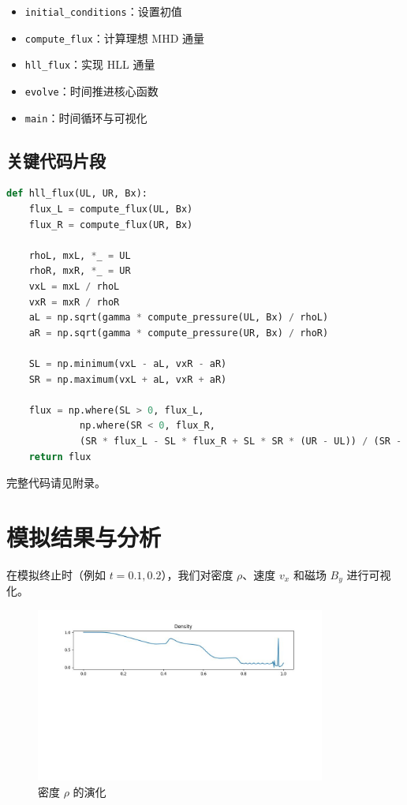 \documentclass[12pt]{article}
\begin{document}
\begin{itemize}
    \item \texttt{initial\_conditions}：设置初值
    \item \texttt{compute\_flux}：计算理想 MHD 通量
    \item \texttt{hll\_flux}：实现 HLL 通量
    \item \texttt{evolve}：时间推进核心函数
    \item \texttt{main}：时间循环与可视化
\end{itemize}

\subsection*{关键代码片段}

\begin{lstlisting}[language=Python, caption=HLL 数值通量计算]
def hll_flux(UL, UR, Bx):
    flux_L = compute_flux(UL, Bx)
    flux_R = compute_flux(UR, Bx)

    rhoL, mxL, *_ = UL
    rhoR, mxR, *_ = UR
    vxL = mxL / rhoL
    vxR = mxR / rhoR
    aL = np.sqrt(gamma * compute_pressure(UL, Bx) / rhoL)
    aR = np.sqrt(gamma * compute_pressure(UR, Bx) / rhoR)

    SL = np.minimum(vxL - aL, vxR - aR)
    SR = np.maximum(vxL + aL, vxR + aR)

    flux = np.where(SL > 0, flux_L,
             np.where(SR < 0, flux_R,
             (SR * flux_L - SL * flux_R + SL * SR * (UR - UL)) / (SR - SL)))
    return flux
\end{lstlisting}

完整代码请见附录。

\section{模拟结果与分析}

在模拟终止时（例如 $t = 0.1, 0.2$），我们对密度 $\rho$、速度 $v_x$ 和磁场 $B_y$ 进行可视化。

\begin{figure}[H]
    \centering
    \includegraphics[width=0.85\textwidth]{density.jpg}
    \caption{密度 $\rho$ 的演化}
\end{figure}
\end{document}

